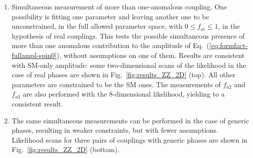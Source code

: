 \begin{enumerate}
  \item Simultaneous measurement of more than one-anomalous coupling.
    One possibility is fitting one parameter and leaving another one
    to be unconstrained, in the full allowed parameter space, with
    $0\le f_{ai}\le 1$, in the hypothesis of real couplings. This
    tests the possible simultaneous presence of more than one
    anomalous contribution to the amplitude of
    Eq.~(\ref{eq:formfact-fullampl-spin0}), without assumptions on one
    of them. Results are consistent with SM-only amplitude: some
    two-dimensional scans of the likelihood in the case of real phases
    are shown in Fig.~\ref{fig:results_ZZ_2D} (top). All other
    parameters are constrained to be the SM ones. The measurements of
    $f_{a2}$ and $f_{a3}$ are also performed with the 8-dimensional
    likelihood, yielding to a consistent result.
\item The same simultaneous measurements can be performed in the case
  of generic phases, resulting in weaker constraints, but with fewer
  assumptions. Likelihood scans for three pairs of couplings with
  generic phases are shown in Fig.~\ref{fig:results_ZZ_2D} (bottom).


\end{enumerate}
